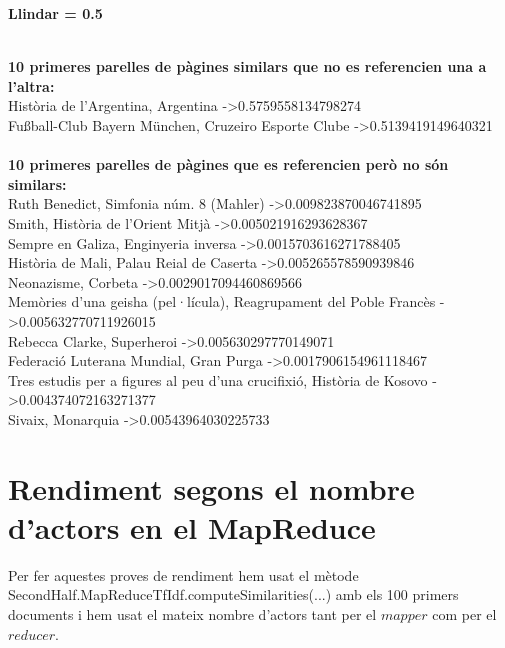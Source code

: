 \documentclass{report}
\begin{document}
\newline
\centerline{ \textbf{Llindar = 0.5} }
\newline
 \\ 
\textbf{10 primeres parelles de pàgines similars que no es referencien una a l'altra:} \\ 
Història de l'Argentina, Argentina -\textgreater 0.5759558134798274 \\ 
Fußball-Club Bayern München, Cruzeiro Esporte Clube -\textgreater 0.5139419149640321 \\ 
 \\ 
\textbf{10 primeres parelles de pàgines que es referencien però no són similars:} \\ 
Ruth Benedict, Simfonia núm. 8 (Mahler) -\textgreater 0.009823870046741895 \\ 
Smith, Història de l'Orient Mitjà -\textgreater 0.005021916293628367 \\ 
Sempre en Galiza, Enginyeria inversa -\textgreater 0.0015703616271788405 \\ 
Història de Mali, Palau Reial de Caserta -\textgreater 0.005265578590939846 \\ 
Neonazisme, Corbeta -\textgreater 0.0029017094460869566 \\ 
Memòries d'una geisha (pel·lícula), Reagrupament del Poble Francès -\textgreater 0.005632770711926015 \\ 
Rebecca Clarke, Superheroi -\textgreater 0.005630297770149071 \\ 
Federació Luterana Mundial, Gran Purga -\textgreater 0.0017906154961118467 \\ 
Tres estudis per a figures al peu d'una crucifixió, Història de Kosovo -\textgreater 0.004374072163271377 \\ 
Sivaix, Monarquia -\textgreater 0.00543964030225733 \\

\newpage
\section{Rendiment segons el nombre d'actors en el MapReduce}

Per fer aquestes proves de rendiment hem usat el mètode SecondHalf.MapReduceTfIdf.computeSimilarities(...) amb els 100 primers documents i hem usat el mateix nombre d'actors tant per el $mapper$ com per el $reducer$.
\end{document}
